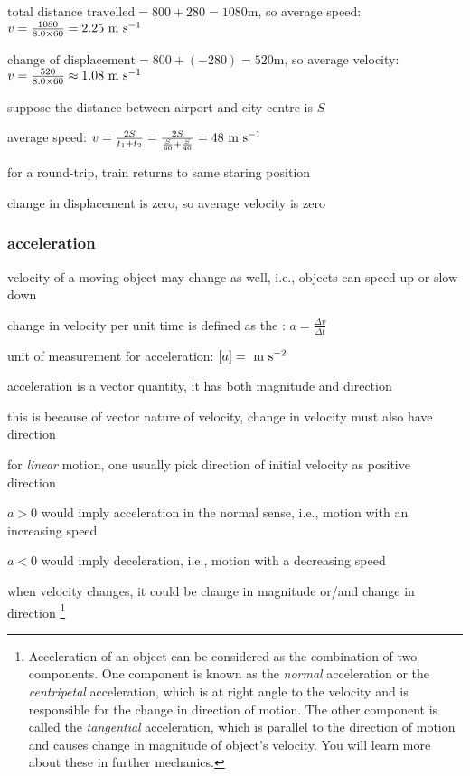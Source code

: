 \sol $\text{total distance travelled} = 800 + 280 = 1080 \text{m}$, so average speed: $v = \frac{1080}{8.0\times60} = 2.25 \text{ m s$^{-1}$}$

\eqyskip  $\text{change of displacement} = 800 + (-280) = 520 \text{m}$, so average velocity: $v = \frac{520}{8.0\times60} \approx 1.08 \text{ m s$^{-1}$}$ \eoe


\sol suppose the distance between airport and city centre is $S$

average speed: $v = \frac{2S}{t_1 + t_2} = \frac{2S}{\frac{S}{60} + \frac{S}{40}} = 48 \text{ m s$^{-1}$}$

for a round-trip, train returns to same staring position

change in displacement is zero, so average velocity is zero \eoe



\subsubsection{acceleration}

velocity of a moving object may change as well, i.e., objects can speed up or slow down

\begin{ilight}
	change in velocity per unit time is defined as the : $\boxed{a = \frac{\Delta v}{\Delta t}}$
\end{ilight}

\cmt unit of measurement for acceleration: $[a]= \text{ m s$^{-2}$}$

\cmt acceleration is a vector quantity, it has both magnitude and direction

this is because of vector nature of velocity, change in velocity must also have direction

\cmt for \emph{linear} motion, one usually pick direction of initial velocity as positive direction

$a>0$ would imply acceleration in the normal sense, i.e., motion with an increasing speed

$a<0$ would imply deceleration, i.e., motion with a decreasing speed

\cmt when velocity changes, it could be change in magnitude or/and change in direction
\footnote{Acceleration of an object can be considered as the combination of two components. One component is known as the \emph{normal} acceleration or the \emph{centripetal} acceleration, which is at right angle to the velocity and is responsible for the change in direction of motion. The other component is called the \emph{tangential} acceleration, which is parallel to the direction of motion and causes change in magnitude of object's velocity. You will learn more about these in further mechanics.}

